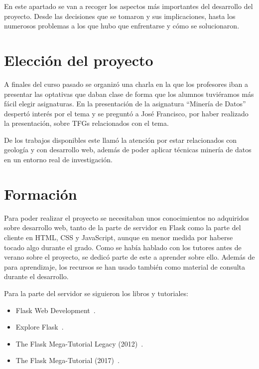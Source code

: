 
En este apartado se van a recoger los aspectos más importantes del desarrollo
del proyecto. Desde las decisiones que se tomaron y sus implicaciones,
hasta los numerosos problemas a los que hubo que enfrentarse y cómo se
solucionaron.

\section{Elección del proyecto}

A finales del curso pasado se organizó una charla en la que los profesores iban
a presentar las optativas que daban clase de forma que los alumnos tuviéramos
más fácil elegir asignaturas. En la presentación de la asignatura ``Minería de
Datos'' despertó interés por el tema y se preguntó a José Francisco, por haber
realizado la presentación, sobre TFGs relacionados con el tema.

De los trabajos disponibles este llamó la atención por estar relacionados con
geología y con desarrollo web, además de poder aplicar técnicas minería de datos
en un entorno real de investigación.

\section{Formación}

Para poder realizar el proyecto se necesitaban unos conocimientos no adquiridos
sobre desarrollo web, tanto de la parte de servidor en Flask como la parte del
cliente en HTML, CSS y JavaScript, aunque en menor medida por haberse tocado
algo durante el grado. Como se había hablado con los tutores antes de verano
sobre el proyecto, se dedicó parte de este a aprender sobre ello. Además de para
aprendizaje, los recursos se han usado también como material de consulta durante
el desarrollo.

\noindent Para la parte del servidor se siguieron los libros y tutoriales:
\begin{itemize}
	\item Flask Web Development~\cite{grinberg2014flask}.
	\item Explore Flask~\cite{exploreflask}.
	\item The Flask Mega-Tutorial Legacy (2012)~\cite{grinberg-mega-legacy}.
	\item The Flask Mega-Tutorial (2017)~\cite{grinberg-mega}.
\end{itemize}

